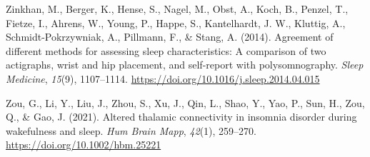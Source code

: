 \documentclass[
]{article}
\newlength{\cslhangindent}
\newenvironment{CSLReferences}[2] %
 {\begin{list}{}{%
  \setlength{\itemindent}{0pt}
  \setlength{\leftmargin}{0pt}
  \setlength{\parsep}{0pt}
  \ifodd #1
   \setlength{\leftmargin}{\cslhangindent}
   \setlength{\itemindent}{-1\cslhangindent}
  \fi
  \setlength{\itemsep}{#2\baselineskip}}}
 {\end{list}}
\begin{document}
\begin{CSLReferences}{1}{0}
Zinkhan, M., Berger, K., Hense, S., Nagel, M., Obst, A., Koch, B., Penzel, T., Fietze, I., Ahrens, W., Young, P., Happe, S., Kantelhardt, J. W., Kluttig, A., Schmidt-Pokrzywniak, A., Pillmann, F., \& Stang, A. (2014). Agreement of different methods for assessing sleep characteristics: A comparison of two actigraphs, wrist and hip placement, and self-report with polysomnography. \emph{Sleep Medicine}, \emph{15}(9), 1107--1114. \url{https://doi.org/10.1016/j.sleep.2014.04.015}

Zou, G., Li, Y., Liu, J., Zhou, S., Xu, J., Qin, L., Shao, Y., Yao, P., Sun, H., Zou, Q., \& Gao, J. (2021). Altered thalamic connectivity in insomnia disorder during wakefulness and sleep. \emph{Hum Brain Mapp}, \emph{42}(1), 259--270. \url{https://doi.org/10.1002/hbm.25221}

\end{CSLReferences}
\end{document}
